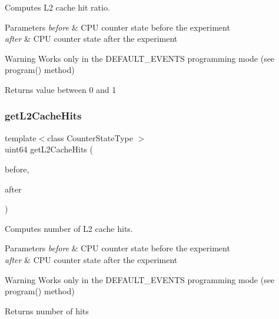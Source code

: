 Computes L2 cache hit ratio. 


\begin{DoxyParams}{Parameters}
{\em before} & C\+PU counter state before the experiment \\
\hline
{\em after} & C\+PU counter state after the experiment \\
\hline
\end{DoxyParams}
\begin{DoxyWarning}{Warning}
Works only in the D\+E\+F\+A\+U\+L\+T\+\_\+\+E\+V\+E\+N\+TS programming mode (see program() method) 
\end{DoxyWarning}
\begin{DoxyReturn}{Returns}
value between 0 and 1 
\end{DoxyReturn}
\mbox{\label{class_basic_counter_state_a459367d7877d09594c2ecd85e04cae61}} 
\subsubsection{\texorpdfstring{get\+L2\+Cache\+Hits}{getL2CacheHits}}
{\footnotesize\ttfamily template$<$class Counter\+State\+Type $>$ \\
uint64 get\+L2\+Cache\+Hits (\begin{DoxyParamCaption}\item[{const Counter\+State\+Type \&}]{before,  }\item[{const Counter\+State\+Type \&}]{after }\end{DoxyParamCaption})\hspace{0.3cm}{\ttfamily [friend]}}



Computes number of L2 cache hits. 


\begin{DoxyParams}{Parameters}
{\em before} & C\+PU counter state before the experiment \\
\hline
{\em after} & C\+PU counter state after the experiment \\
\hline
\end{DoxyParams}
\begin{DoxyWarning}{Warning}
Works only in the D\+E\+F\+A\+U\+L\+T\+\_\+\+E\+V\+E\+N\+TS programming mode (see program() method) 
\end{DoxyWarning}
\begin{DoxyReturn}{Returns}
number of hits 
\end{DoxyReturn}
\mbox{\label{class_basic_counter_state_a291eeab262fdb93de08cdfdf50dbad58}} 
